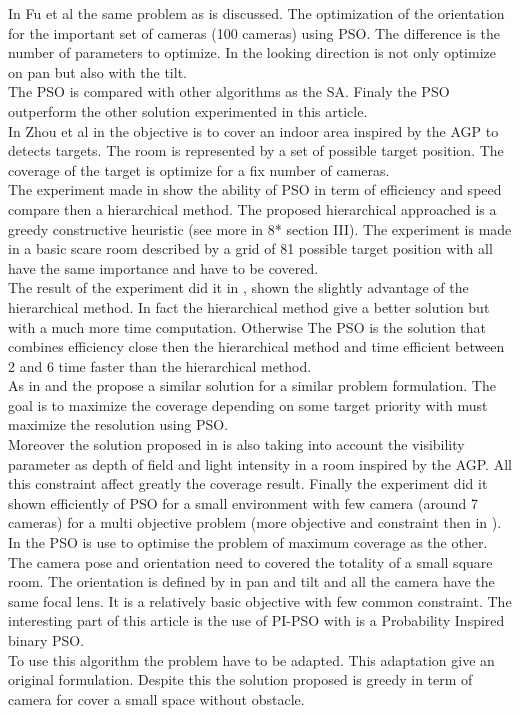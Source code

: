 In Fu et al \cite{194*fu2010} the same problem as \cite{84*xu2011} is discussed. The optimization of the orientation for the important set of cameras (100 cameras) using PSO. The difference is the number of parameters to optimize. In \cite{194*fu2010} the looking direction is not only optimize on pan but also with the tilt.  \\
The PSO is compared with other algorithms as the SA. Finaly the PSO outperform the other solution experimented in this article.\\

In Zhou et al in \cite{8*zhou2011} the objective is to cover an indoor area inspired by the AGP to detects targets. The room is represented by a set of possible target position. The coverage of the target is optimize for a fix number of cameras. \\
 The experiment made in \cite{8*zhou2011} show the ability of PSO in term of efficiency and speed compare then a hierarchical method. The proposed hierarchical approached is a greedy constructive heuristic (see more in 8* section III). The experiment is made in a basic scare room described by a grid of 81 possible target position with all have the same importance and have to be covered. \\
The result of the experiment did it in \cite{8*zhou2011}, shown the slightly advantage of the hierarchical method. In fact the hierarchical method give a better solution but with a much more time computation. Otherwise The PSO is the solution that combines efficiency close then the hierarchical method and time efficient between 2 and 6 time faster than the hierarchical method. \\

As in \cite{8*zhou2011} and the \cite{33*reddy2012}  propose a similar solution for a similar problem formulation. The goal is to maximize the coverage depending on some target priority with must maximize the resolution using PSO.\\
Moreover the solution proposed in \cite{33*reddy2012} is also taking into account the visibility parameter as depth of field and light intensity in a room inspired by the AGP. All this constraint affect greatly the coverage result. Finally the experiment did it  shown efficiently of PSO for a small environment with few camera (around 7 cameras) for a multi objective problem (more objective and constraint then in \cite{8*zhou2011}). \\

In \cite{193*fu2014} the PSO  is use to optimise the problem of maximum coverage as the other. 
 The camera pose and orientation need to covered the totality of a small square room.
 The orientation is defined by in pan and tilt and all the camera have the same focal lens. It is a relatively basic objective with few  common constraint. 
 The interesting part of this article is the use of PI-PSO with is a Probability Inspired binary PSO. \\
 To use this algorithm the problem have to be adapted. This adaptation give an original formulation. Despite this the solution proposed is greedy in term of camera for cover a small space without obstacle.\\
 
